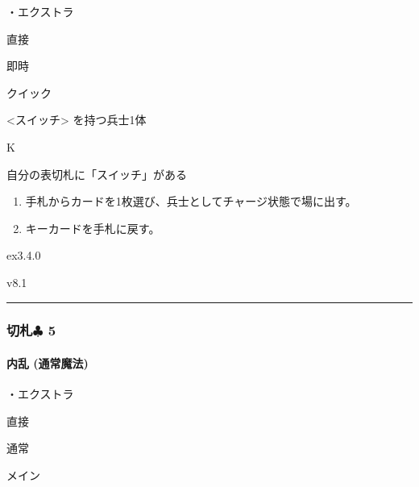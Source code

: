 \documentclass[letterpaper,10pt,dvipdfmx]{sphinxmanual}
\begin{document}
\sphinxAtStartPar
・エクストラ

\sphinxAtStartPar
{} 直接

\sphinxAtStartPar
{} 即時

\sphinxAtStartPar
{} クイック

\sphinxAtStartPar
{} \textless{}スイッチ\textgreater{} を持つ兵士1体

\sphinxAtStartPar
{} K

\sphinxAtStartPar
{}

\sphinxAtStartPar
自分の表切札に「スイッチ」がある

\sphinxAtStartPar
{}
\begin{enumerate}
%
\item {} 
\sphinxAtStartPar
手札からカードを1枚選び、兵士としてチャージ状態で場に出す。

\item {} 
\sphinxAtStartPar
キーカードを手札に戻す。

\end{enumerate}

\sphinxAtStartPar
{}  ex3.4.0

\sphinxAtStartPar
{}  v8.1


\bigskip\hrule\bigskip



\subsubsection{切札{\normalsize $\clubsuit$} 5}
\label{\detokenize{auto/frameActionlist:id71}}

\paragraph{内乱 (通常魔法)}
\label{\detokenize{auto/frameActionlist:act-civilwar}}\label{\detokenize{auto/frameActionlist:id72}}
\sphinxAtStartPar
{}

\sphinxAtStartPar
・エクストラ

\sphinxAtStartPar
{} 直接

\sphinxAtStartPar
{} 通常

\sphinxAtStartPar
{} メイン
\end{document}
